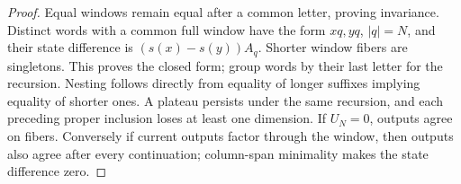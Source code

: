\begin{proof}
Equal windows remain equal after a common letter, proving invariance. Distinct words with a common full window have the form $xq,yq$, $|q|=N$, and their state difference is $(s(x)-s(y))A_q$. Shorter window fibers are singletons. This proves the closed form; group words by their last letter for the recursion. Nesting follows directly from equality of longer suffixes implying equality of shorter ones. A plateau persists under the same recursion, and each preceding proper inclusion loses at least one dimension. If $U_N=0$, outputs agree on fibers. Conversely if current outputs factor through the window, then outputs also agree after every continuation; column-span minimality makes the state difference zero.
\end{proof}
